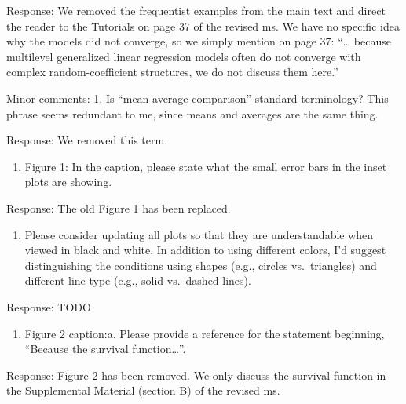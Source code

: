 \documentclass[
]{article}
\providecommand{\tightlist}{%
  \setlength{\itemsep}{0pt}\setlength{\parskip}{0pt}}
\renewenvironment{quote}{\begin{leftbar}}{\end{leftbar}}
\begin{document}
Response: We removed the frequentist examples from the main text and
direct the reader to the Tutorials on page 37 of the revised ms. We have
no specific idea why the models did not converge, so we simply mention
on page 37: ``\ldots{} because multilevel generalized linear regression
models often do not converge with complex random-coefficient structures,
we do not discuss them here.''

\begin{quote}
Minor comments: 1. Is ``mean-average comparison'' standard terminology?
This phrase seems redundant to me, since means and averages are the same
thing.
\end{quote}

Response: We removed this term.

\begin{quote}
\begin{enumerate}
\def\labelenumi{\arabic{enumi}.}
\setcounter{enumi}{1}
\tightlist
\item
  Figure 1: In the caption, please state what the small error bars in
  the inset plots are showing.
\end{enumerate}
\end{quote}

Response: The old Figure 1 has been replaced.

\begin{quote}
\begin{enumerate}
\def\labelenumi{\arabic{enumi}.}
\setcounter{enumi}{2}
\tightlist
\item
  Please consider updating all plots so that they are understandable
  when viewed in black and white. In addition to using different colors,
  I'd suggest distinguishing the conditions using shapes (e.g., circles
  vs.~triangles) and different line type (e.g., solid vs.~dashed lines).
\end{enumerate}
\end{quote}

Response: TODO

\begin{quote}
\begin{enumerate}
\def\labelenumi{\arabic{enumi}.}
\setcounter{enumi}{3}
\tightlist
\item
  Figure 2 caption:a. Please provide a reference for the statement
  beginning, ``Because the survival function\ldots{}''.
\end{enumerate}
\end{quote}

Response: Figure 2 has been removed. We only discuss the survival
function in the Supplemental Material (section B) of the revised ms.
\end{document}

